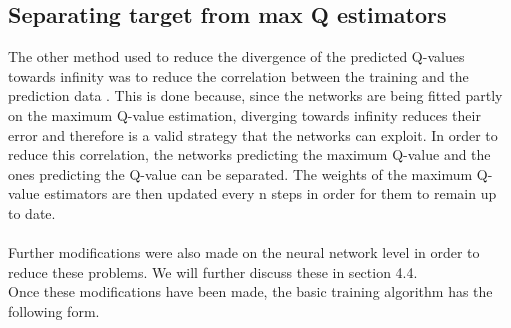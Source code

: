 \subsection{Separating target from max Q estimators}
The other method used to reduce the divergence of the predicted Q-values towards infinity was to reduce the correlation between the training and the prediction data \cite{Mnih2015}. This is done because, since the networks are being fitted partly on the maximum Q-value estimation, diverging towards infinity reduces their error and therefore is a valid strategy that the networks can exploit. In order to reduce this correlation, the networks predicting the maximum Q-value and the ones predicting the Q-value can be separated. The weights of the maximum Q-value estimators are then updated every n steps in order for them to remain up to date.\\
\mbox{}\\
Further modifications were also made on the neural network level in order to reduce these problems. We will further discuss these in section 4.4.\\
Once these modifications have been made, the basic training algorithm has the following form.


